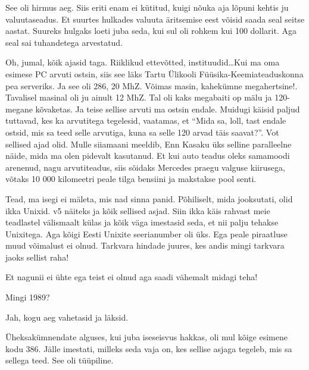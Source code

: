 See oli hirmus aeg. Siis eriti enam ei kütitud, kuigi nõuka aja lõpuni kehtis ju  valuutaseadus. Et suurtes hulkades valuuta äritsemise eest võisid saada seal seitse aastat. Suureks hulgaks loeti juba seda, kui sul oli rohkem kui 100 dollarit. Aga seal sai tuhandetega arvestatud.


Oh, jumal, kõik ajasid taga. Riiklikud ettevõtted, instituudid\ldots  Kui ma oma esimese PC arvuti ostsin, siis see läks Tartu Ülikooli Füüsika-Keemiateaduskonna pea serveriks. Ja see oli 286, 20 MhZ. Võimas masin, kahekümne megahertsine!. Tavalisel masinal oli ju ainult 12 MhZ. Tal oli kaks megabaiti op mälu ja 120-megane kõvaketas. Ja teise sellise arvuti ma ostsin endale. Muidugi käisid paljud tuttavad, kes ka arvutitega tegelesid, vaatamas, et \enquote{Mida sa, loll, tast endale ostsid, mis sa teed selle arvutiga, kuna sa selle 120 arvad täis saavat?}. Vot sellised ajad olid. Mulle siiamaani meeldib, Enn Kasaku  üks selline paralleelne näide, mida ma olen pidevalt kasutanud. Et kui auto teadus oleks samamoodi arenenud, nagu arvutiteadus, siis sõidaks Mercedes praegu valguse kiirusega, võtaks  10 000 kilomeetri peale tilga bensiini ja makstakse pool senti.


Tead, ma isegi ei mäleta, mis nad sinna panid. Põhiliselt, mida jooksutati, olid ikka Unixid. v5 näiteks ja kõik sellised asjad. Siin ikka käis rahvast meie teadlastel välismaalt külas ja kõik väga imestasid seda, et nii palju tehakse Unixitega. Aga kõigi Eesti Unixite seerianumber oli üks. Ega peale piraatluse muud võimalust ei olnud. Tarkvara hindade juures, kes andis mingi tarkvara jaoks sellist raha!


Et nagunii ei ühte ega teist ei olnud aga saadi vähemalt midagi teha!


Mingi 1989? 
                 

Jah, kogu aeg vahetasid ja läksid. 

Üheksakümnendate alguses, kui juba iseseisvus hakkas, oli mul kõige esimene kodu 386. Jälle imestati, milleks seda vaja on, kes sellise asjaga tegeleb, mis sa sellega teed. See oli tüüpiline.


